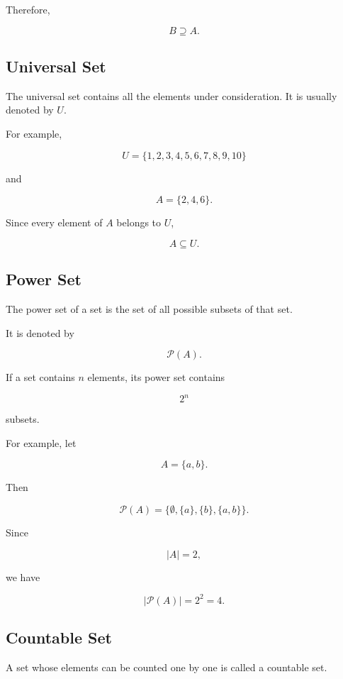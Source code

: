 \documentclass[12pt,a4paper]{article}
\begin{document}
Therefore,

\[
B\supseteq A.
\]


\subsection{Universal Set}

The universal set contains all the elements under consideration. It is usually
denoted by $U$.

For example,

\[
U=\{1,2,3,4,5,6,7,8,9,10\}
\]

and

\[
A=\{2,4,6\}.
\]

Since every element of $A$ belongs to $U$,

\[
A\subseteq U.
\]


\subsection{Power Set}

The power set of a set is the set of all possible subsets of that set.

It is denoted by

\[
\mathcal{P}(A).
\]

If a set contains $n$ elements, its power set contains

\[
2^n
\]

subsets.

For example, let

\[
A=\{a,b\}.
\]

Then

\[
\mathcal{P}(A)
=
\{\emptyset,\{a\},\{b\},\{a,b\}\}.
\]

Since

\[
|A|=2,
\]

we have

\[
|\mathcal{P}(A)|=2^2=4.
\]


\subsection{Countable Set}

A set whose elements can be counted one by one is called a countable set.
\end{document}
